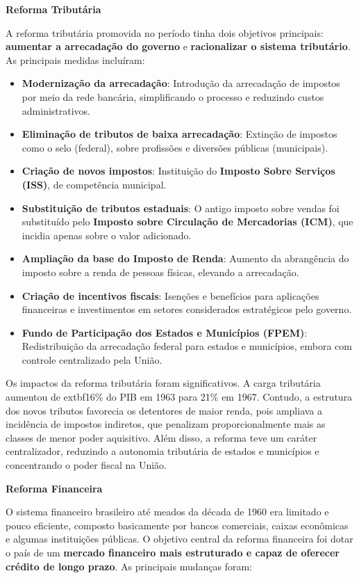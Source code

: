 \documentclass[a4paper,12pt]{article}[abntex2]
\begin{document}
\textbf{Reforma Tributária}

A reforma tributária promovida no período tinha dois objetivos principais: 			\textbf{aumentar a arrecadação do governo} e 			\textbf{racionalizar o sistema tributário}. As principais medidas incluíram:

\begin{itemize}
    \item 			\textbf{Modernização da arrecadação}: Introdução da arrecadação de impostos por meio da rede bancária, simplificando o processo e reduzindo custos administrativos.
    \item 			\textbf{Eliminação de tributos de baixa arrecadação}: Extinção de impostos como o selo (federal), sobre profissões e diversões públicas (municipais).
    \item 			\textbf{Criação de novos impostos}: Instituição do \textbf{Imposto Sobre Serviços (ISS)}, de competência municipal.
    \item \textbf{Substituição de tributos estaduais}: O antigo imposto sobre vendas foi substituído pelo \textbf{Imposto sobre Circulação de Mercadorias (ICM)}, que incidia apenas sobre o valor adicionado.
    \item \textbf{Ampliação da base do Imposto de Renda}: Aumento da abrangência do imposto sobre a renda de pessoas físicas, elevando a arrecadação.
    \item \textbf{Criação de incentivos fiscais}: Isenções e benefícios para aplicações financeiras e investimentos em setores considerados estratégicos pelo governo.
    \item \textbf{Fundo de Participação dos Estados e Municípios (FPEM)}: Redistribuição da arrecadação federal para estados e municípios, embora com controle centralizado pela União.
\end{itemize}

Os impactos da reforma tributária foram significativos. A carga tributária aumentou de 			extbf{16\% do PIB em 1963 para 21\% em 1967}. Contudo, a estrutura dos novos tributos favorecia os detentores de maior renda, pois ampliava a incidência de impostos indiretos, que penalizam proporcionalmente mais as classes de menor poder aquisitivo. Além disso, a reforma teve um caráter centralizador, reduzindo a autonomia tributária de estados e municípios e concentrando o poder fiscal na União.

\textbf{Reforma Financeira}

O sistema financeiro brasileiro até meados da década de 1960 era limitado e pouco eficiente, composto basicamente por bancos comerciais, caixas econômicas e algumas instituições públicas. O objetivo central da reforma financeira foi dotar o país de um 			\textbf{mercado financeiro mais estruturado e capaz de oferecer crédito de longo prazo}. As principais mudanças foram:
\end{document}
